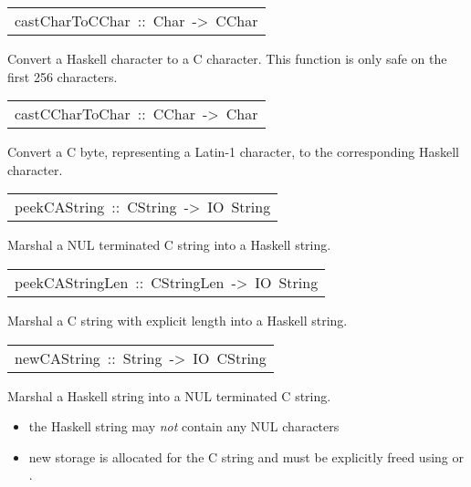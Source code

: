 \begin{haddockdesc}
\item[\begin{tabular}{@{}l}
castCharToCChar\ ::\ Char\ ->\ CChar
\end{tabular}]\haddockbegindoc
Convert a Haskell character to a C character.
 This function is only safe on the first 256 characters.
\par

\end{haddockdesc}
\begin{haddockdesc}
\item[\begin{tabular}{@{}l}
castCCharToChar\ ::\ CChar\ ->\ Char
\end{tabular}]\haddockbegindoc
Convert a C byte, representing a Latin-1 character, to the corresponding
 Haskell character.
\par

\end{haddockdesc}
\begin{haddockdesc}
\item[\begin{tabular}{@{}l}
peekCAString\ ::\ CString\ ->\ IO\ String
\end{tabular}]\haddockbegindoc
Marshal a NUL terminated C string into a Haskell string.
\par

\end{haddockdesc}
\begin{haddockdesc}
\item[\begin{tabular}{@{}l}
peekCAStringLen\ ::\ CStringLen\ ->\ IO\ String
\end{tabular}]\haddockbegindoc
Marshal a C string with explicit length into a Haskell string.
\par

\end{haddockdesc}
\begin{haddockdesc}
\item[\begin{tabular}{@{}l}
newCAString\ ::\ String\ ->\ IO\ CString
\end{tabular}]\haddockbegindoc
Marshal a Haskell string into a NUL terminated C string.
\par
\begin{itemize}
\item
 the Haskell string may \emph{not} contain any NUL characters
\par

\item
 new storage is allocated for the C string and must be
   explicitly freed using  or
   .
\par

\end{itemize}

\end{haddockdesc}
